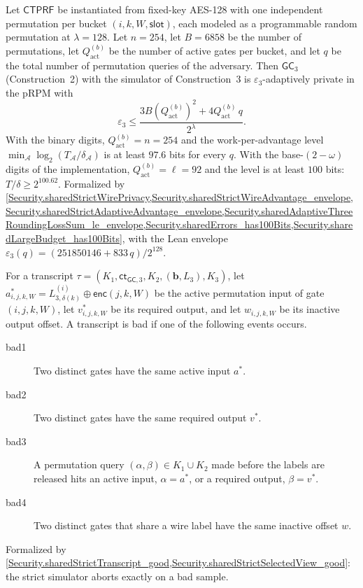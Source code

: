 \begin{paperlem}\label{babe:lem14}
Let $\mathsf{CTPRF}$ be instantiated from fixed-key AES-128 with one independent permutation per bucket $(i, k, W, \mathsf{slot})$, each modeled as a programmable random permutation at $\lambda = 128$.
Let $n = 254$, let $B = 6858$ be the number of permutations, let $Q^{(b)}_{\mathrm{act}}$ be the number of active gates per bucket, and let $q$ be the total number of permutation queries of the adversary.
Then $\mathsf{GC}_3$ (Construction~2) with the simulator of Construction~3 is $\varepsilon_3$-adaptively private in the pRPM with
\[
  \varepsilon_3 \leq \frac{3 B (Q^{(b)}_{\mathrm{act}})^2 + 4 Q^{(b)}_{\mathrm{act}}\, q}{2^{\lambda}} .
\]
With the binary digits, $Q^{(b)}_{\mathrm{act}} = n = 254$ and the work-per-advantage level $\min_{\mathcal{A}} \log_2(T_{\mathcal{A}} / \delta_{\mathcal{A}})$ is at least $97.6$ bits for every $q$.
With the base-$(2-\omega)$ digits of the implementation, $Q^{(b)}_{\mathrm{act}} = \ell = 92$ and the level is at least $100$ bits: $T / \delta \geq 2^{100.62}$.
Formalized by \cref{Security.sharedStrictWirePrivacy,Security.sharedStrictWireAdvantage_envelope,Security.sharedStrictAdaptiveAdvantage_envelope,Security.sharedAdaptiveThreeRoundingLossSum_le_envelope,Security.sharedErrors_has100Bits,Security.sharedLargeBudget_has100Bits}, with the Lean envelope $\varepsilon_3(q) = (251850146 + 833\,q) / 2^{128}$.
\end{paperlem}

\begin{paperdef}\label{babe:def20}
For a transcript $\tau = (K_1, \mathsf{ct}_{\mathsf{GC},3}, K_2, (\mathbf{b}, L_3), K_3)$, let $a^*_{i,j,k,W} = L^{(i)}_{3,\delta(k)} \oplus \mathsf{enc}(j, k, W)$ be the active permutation input of gate $(i, j, k, W)$, let $v^*_{i,j,k,W}$ be its required output, and let $w_{i,j,k,W}$ be its inactive output offset.
A transcript is bad if one of the following events occurs.
\begin{description}
  \item[bad1] Two distinct gates have the same active input $a^*$.
  \item[bad2] Two distinct gates have the same required output $v^*$.
  \item[bad3] A permutation query $(\alpha, \beta) \in K_1 \cup K_2$ made before the labels are released hits an active input, $\alpha = a^*$, or a required output, $\beta = v^*$.
  \item[bad4] Two distinct gates that share a wire label have the same inactive offset $w$.
\end{description}
Formalized by \cref{Security.sharedStrictTranscript_good,Security.sharedStrictSelectedView_good}: the strict simulator aborts exactly on a bad sample.
\end{paperdef}

